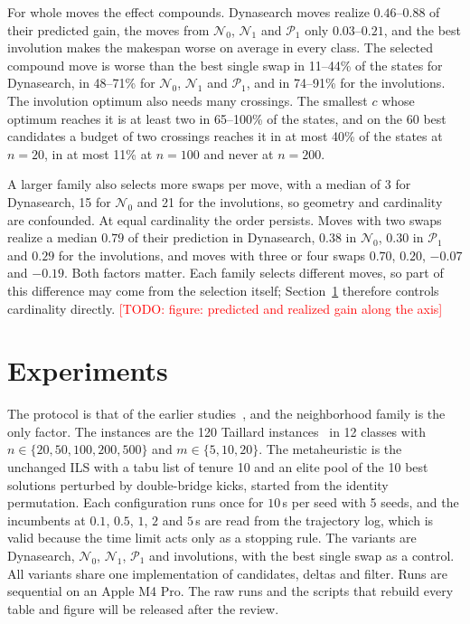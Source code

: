\documentclass{article}
\newcommand{\todo}[1]{\textcolor{red}{[TODO: #1]}}
\newcommand{\N}{\mathcal{N}}
\newcommand{\Pa}{\mathcal{P}}
\begin{document}
For whole moves the effect compounds. Dynasearch moves realize
$0.46$--$0.88$ of their predicted gain, the moves from $\N_0$, $\N_1$
and $\Pa_1$ only $0.03$--$0.21$, and the best involution makes the
makespan worse on average in every class. The selected compound move is
worse than the best single swap in 11--44\% of the states for
Dynasearch, in 48--71\% for $\N_0$, $\N_1$ and $\Pa_1$, and in 74--91\%
for the involutions. The involution optimum also needs many crossings.
The smallest $c$ whose optimum reaches it is at least two in 65--100\%
of the states, and on the 60 best candidates a budget of two crossings
reaches it in at most 40\% of the states at $n=20$, in at most 11\% at
$n=100$ and never at $n=200$.

A larger family also selects more swaps per move, with a median of 3
for Dynasearch, 15 for $\N_0$ and 21 for the involutions, so geometry
and cardinality are confounded. At equal cardinality the order
persists. Moves with two swaps realize a median $0.79$ of their
prediction in Dynasearch, $0.38$ in $\N_0$, $0.30$ in $\Pa_1$ and $0.29$
for the involutions, and moves with three or four swaps $0.70$, $0.20$,
$-0.07$ and $-0.19$. Both factors matter. Each family selects different
moves, so part of this difference may come from the selection itself;
Section~\ref{sec:exp} therefore controls cardinality directly.
\todo{figure: predicted and realized gain along the axis}

\section{Experiments}\label{sec:exp}

The protocol is that of the earlier studies~\cite{windowed_own}, and the
neighborhood family is the only factor. The
instances are the 120 Taillard instances~\cite{taillard1993} in 12
classes with $n\in\{20,50,100,200,500\}$ and $m\in\{5,10,20\}$. The
metaheuristic is the unchanged ILS with a tabu list of tenure 10 and an
elite pool of the 10 best solutions perturbed by double-bridge kicks,
started from the identity permutation. Each configuration runs once for
$10$\,s per seed with 5 seeds, and the incumbents at $0.1$, $0.5$, $1$,
$2$ and $5$\,s are read from the trajectory log, which is valid because
the time limit acts only as a stopping rule. The variants are
Dynasearch, $\N_0$, $\N_1$, $\Pa_1$ and involutions, with the best
single swap as a control. All
variants share one implementation of candidates, deltas and filter. Runs
are sequential on an Apple M4 Pro. The raw runs and the scripts that
rebuild every table and figure will be released after the review.
\end{document}
